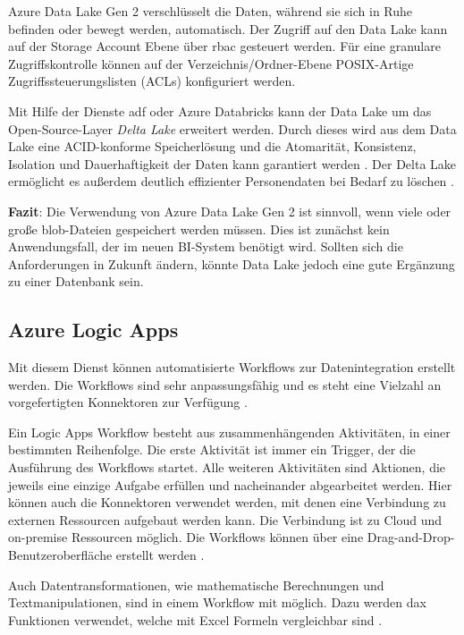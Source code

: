 Azure Data Lake Gen 2 verschlüsselt die Daten, während sie sich in Ruhe befinden oder bewegt werden, automatisch. Der Zugriff auf den Data Lake kann auf der Storage Account Ebene über \ac{rbac} gesteuert werden. Für eine granulare Zugriffskontrolle können auf der Verzeichnis/Ordner-Ebene POSIX-Artige Zugriffssteuerungslisten (ACLs) konfiguriert werden.

Mit Hilfe der Dienste \ac{adf} oder Azure Databricks kann der Data Lake um das Open-Source-Layer \textit{Delta Lake} erweitert werden. Durch dieses wird aus dem Data Lake eine ACID-konforme Speicherlösung und die Atomarität, Konsistenz, Isolation und Dauerhaftigkeit der Daten kann garantiert werden \cite{lesteve_definitive_2021}. Der Delta Lake ermöglicht es außerdem deutlich effizienter Personendaten bei Bedarf zu löschen \cite{brown_best_2021}.

\textbf{Fazit}: Die Verwendung von Azure Data Lake Gen 2 ist sinnvoll, wenn viele oder große \ac{blob}-Dateien gespeichert werden müssen. Dies ist zunächst kein Anwendungsfall, der im neuen BI-System benötigt wird. Sollten sich die Anforderungen in Zukunft ändern, könnte Data Lake jedoch eine gute Ergänzung zu einer Datenbank sein.

\subsection{Azure Logic Apps} \label{sec:grundlagen:azure_dienste:logicApps}
Mit diesem Dienst können automatisierte Workflows zur Datenintegration erstellt werden. Die Workflows sind sehr anpassungsfähig und es steht eine Vielzahl an vorgefertigten Konnektoren zur Verfügung \cite{kumar_serverless_2019}.

Ein Logic Apps Workflow besteht aus zusammenhängenden Aktivitäten, in einer bestimmten Reihenfolge. Die erste Aktivität ist immer ein Trigger, der die Ausführung des Workflows startet. Alle weiteren Aktivitäten sind Aktionen, die jeweils eine einzige Aufgabe erfüllen und nacheinander abgearbeitet werden. Hier können auch die Konnektoren verwendet werden, mit denen eine Verbindung zu externen Ressourcen aufgebaut werden kann. Die Verbindung ist zu Cloud und on-premise Ressourcen möglich. Die Workflows können über eine Drag-and-Drop-Benutzeroberfläche erstellt werden \cite{modi_azure_2020}.

Auch Datentransformationen, wie mathematische Berechnungen und Textmanipulationen, sind in einem Workflow mit möglich. Dazu werden \ac{dax} Funktionen verwendet, welche mit Excel Formeln vergleichbar sind \cite{bennett_enterprise_2021}.

